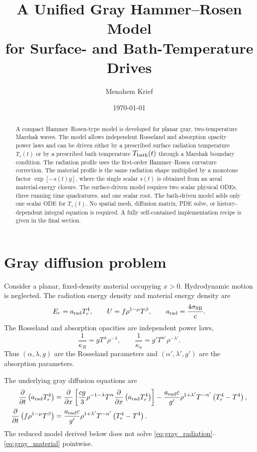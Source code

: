 \documentclass[11pt]{article}
\title{A Unified Gray Hammer--Rosen Model\\for Surface- and Bath-Temperature Drives}
\author{Menahem Krief}
\date{\today}
\numberwithin{equation}{section}
\newcommand{\Ts}{T_s}
\newcommand{\Tb}{T_{\rm bath}}
\newcommand{\Tr}{T_r}
\newcommand{\arad}{a_{\rm rad}}
\begin{document}
\maketitle

\begin{abstract}
A compact Hammer--Rosen-type model is developed for planar gray,
two-temperature Marshak waves.  The model allows independent Rosseland and
absorption opacity power laws and can be driven either by a prescribed surface
radiation temperature $\Ts(t)$ or by a prescribed bath temperature $\Tb(t)$
through a Marshak boundary condition.  The radiation profile uses the
first-order Hammer--Rosen curvature correction.  The material profile is the
same radiation shape multiplied by a monotone factor $\exp[-s(t)y]$, where the
single scalar $s(t)$ is obtained from an areal material-energy closure.  The
surface-driven model requires two scalar physical ODEs, three running time
quadratures, and one scalar root.  The bath-driven model adds only one scalar
ODE for $\Ts(t)$.  No spatial mesh, diffusion matrix, PDE solve, or
history-dependent integral equation is required.  A fully self-contained
implementation recipe is given in the final section.
\end{abstract}

\tableofcontents

\section{Gray diffusion problem}

Consider a planar, fixed-density material occupying $x>0$.  Hydrodynamic
motion is neglected.  The radiation energy density and material energy density
are
\begin{equation}
 E_r=\arad\Tr^4,
 \qquad
 U=f\rho^{1-\mu}T^\beta,
 \qquad
 \arad=\frac{4\sigma_{\rm SB}}{c}.
 \label{eq:energies}
\end{equation}
The Rosseland and absorption opacities are independent power laws,
\begin{equation}
 \frac{1}{\kappa_R}=gT^\alpha\rho^{-\lambda},
 \qquad
 \frac{1}{\kappa_a}=g'T^{\alpha'}\rho^{-\lambda'}.
 \label{eq:opacities}
\end{equation}
Thus $(\alpha,\lambda,g)$ are the Rosseland parameters and
$(\alpha',\lambda',g')$ are the absorption parameters.

The underlying gray diffusion equations are
\begin{align}
 \frac{\partial}{\partial t}\left(\arad\Tr^4\right)
 &=\frac{\partial}{\partial x}
 \left[
 \frac{cg}{3}\rho^{-1-\lambda}T^\alpha
 \frac{\partial}{\partial x}\left(\arad\Tr^4\right)
 \right]
 -\frac{\arad c}{g'}\rho^{1+\lambda'}T^{-\alpha'}
 \left(\Tr^4-T^4\right),
 \label{eq:gray_radiation}\\
 \frac{\partial}{\partial t}
 \left(f\rho^{1-\mu}T^\beta\right)
 &=\frac{\arad c}{g'}\rho^{1+\lambda'}T^{-\alpha'}
 \left(\Tr^4-T^4\right).
 \label{eq:gray_material}
\end{align}
The reduced model derived below does not solve
\eqref{eq:gray_radiation}--\eqref{eq:gray_material} pointwise.
\end{document}
